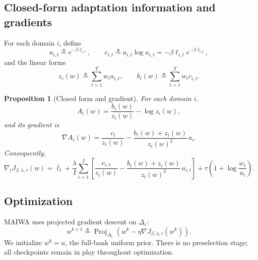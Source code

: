 \documentclass{article}
\newtheorem{proposition}{Proposition}
\newcommand{\proj}{\operatorname{Proj}}
\newcommand{\simplex}{\Delta}
\newcommand{\maiwa}{\textup{\textsc{MAIWA}}}
\newcommand{\epssimplex}{\simplex_{\varepsilon}}
\begin{document}
\subsection{Closed-form adaptation information and gradients}

For each domain \(i\), define
\begin{equation}
    a_{i,t} \triangleq e^{-\beta \ell_{i,t}},
    \qquad
    c_{i,t} \triangleq a_{i,t}\log a_{i,t} = -\beta \ell_{i,t} e^{-\beta \ell_{i,t}},
\end{equation}
and the linear forms
\begin{equation}
    z_i(w) \triangleq \sum_{t=1}^{T} w_t a_{i,t},
    \qquad
    b_i(w) \triangleq \sum_{t=1}^{T} w_t c_{i,t}.
\end{equation}

\begin{proposition}[Closed form and gradient]
\label{prop:closed_form}
For each domain \(i\),
\begin{equation}
    A_i(w)
    =
    \frac{b_i(w)}{z_i(w)} - \log z_i(w),
    \label{eq:Ai_closed}
\end{equation}
and its gradient is
\begin{equation}
    \nabla A_i(w)
    =
    \frac{c_i}{z_i(w)}
    -
    \frac{b_i(w)+z_i(w)}{z_i(w)^2}\, a_i.
    \label{eq:Ai_gradient}
\end{equation}
Consequently,
\begin{equation}
    \nabla_t J_{\beta,\lambda,\tau}(w)
    =
    \bar \ell_t
    +
    \frac{\lambda}{I}\sum_{i=1}^{I}
    \left[
        \frac{c_{i,t}}{z_i(w)}
        -
        \frac{b_i(w)+z_i(w)}{z_i(w)^2}\, a_{i,t}
    \right]
    +
    \tau\left(1 + \log\frac{w_t}{u_t}\right).
    \label{eq:J_gradient}
\end{equation}
\end{proposition}

\subsection{Optimization}

\maiwa{} uses projected gradient descent on \(\epssimplex\):
\begin{equation}
    w^{k+1}
    \triangleq
    \proj_{\epssimplex}
    \left(
        w^k - \eta \nabla J_{\beta,\lambda,\tau}(w^k)
    \right).
    \label{eq:pgd}
\end{equation}
We initialize \(w^0=u\), the full-bank uniform prior. There is no preselection stage; all checkpoints remain in play throughout optimization.
\end{document}
